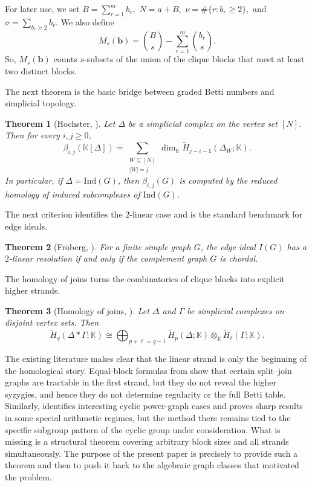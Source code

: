 \documentclass[12pt]{article}
\newtheorem{theorem}{Theorem}[section]
\theoremstyle{definition}
\theoremstyle{remark}
\newcommand{\kk}{\mathbb{K}}
\newcommand{\ind}{\mathrm{Ind}}
\newcommand{\bk}[1]{\mathbf{#1}}
\newcommand{\wt}{\widetilde}
\begin{document}
	For later use, we set
	$ B=\sum_{r=1}^m b_r,$  $N=a+B,$ $\nu=\#\{r: b_r\geq 2\},$ and $\sigma=\sum_{b_r\geq 2} b_r.$ 	We also define
	$$
	M_s(\bk{b})=\binom{B}{s}-\sum_{r=1}^m \binom{b_r}{s}.
	$$
	So, $M_s(\bk{b})$ counts $s$-subsets of the union of the clique blocks that meet at least two distinct blocks.
	
	
	\medskip The next theorem is the basic bridge between graded Betti numbers and simplicial topology.
	
	\begin{theorem}[Hochster, \cite{Hochster1977,HerzogHibi2010}]\label{thm:Hochster}
		Let $\Delta$ be a simplicial complex on the vertex set $[N]$. Then for every $i,j\geq 0$,
		$$
		\beta_{i,j}(\kk[\Delta])=\sum_{\substack{W\subseteq [N]\\ |W|=j}}
		\dim_{\kk}\wt H_{j-i-1}(\Delta_W;\kk).
		$$
		In particular, if $\Delta=\ind(G)$, then $\beta_{i,j}(G)$ is computed by the reduced homology of induced subcomplexes of $\ind(G)$.
	\end{theorem}
	
	
	 \medskip The next criterion identifies the $2$-linear case and is the standard benchmark for edge ideals.
	
	\begin{theorem}[Fröberg, \cite{Froberg1990,Froberg2023}]\label{thm:Froberg}
		For a finite simple graph $G$, the edge ideal $I(G)$ has a $2$-linear resolution if and only if the complement graph $\overline{G}$ is chordal.
	\end{theorem}
	
	 \medskip The homology of joins turns the combinatorics of clique blocks into explicit higher strands.
	
	\begin{theorem}[Homology of joins, \cite{BrunsHerzog1998,HerzogHibi2010}]\label{thm:join-homology}
		Let $\Delta$ and $\Gamma$ be simplicial complexes on disjoint vertex sets. Then
		$$
		\wt H_q(\Delta * \Gamma;\kk)\cong \bigoplus_{p+\ell=q-1}\wt H_p(\Delta;\kk)\otimes_{\kk}\wt H_\ell(\Gamma;\kk).
		$$
	\end{theorem}
	
	
	 
	The existing literature makes clear that the linear strand is only the beginning of the homological story. Equal-block formulas from \cite{Rather2024} show that certain split--join graphs are tractable in the first strand, but they do not reveal the higher syzygies, and hence they do not determine regularity or the full Betti table. Similarly, \cite{RatherWang2026} identifies interesting cyclic power-graph cases and proves sharp results in some special arithmetic regimes, but the method there remains tied to the specific subgroup pattern of the cyclic group under consideration. What is missing is a structural theorem covering arbitrary block sizes and all strands simultaneously. The purpose of the present paper is precisely to provide such a theorem and then to push it back to the algebraic graph classes that motivated the problem.
	
\end{document}
